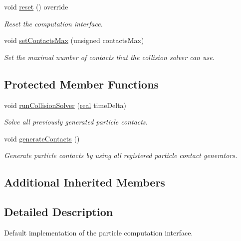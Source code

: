 \begin{DoxyCompactItemize}
void \mbox{\hyperlink{classr3_1_1_default_particle_engine_c_i_a97757c62b4cb1266da29e2b5625bb9d3}{reset}} () override
\begin{DoxyCompactList}\small\item\em Reset the computation interface. \end{DoxyCompactList}\item 
void \mbox{\hyperlink{classr3_1_1_default_particle_engine_c_i_a7dbb49cbf2f5b028656ea2e14174a3ed}{set\+Contacts\+Max}} (unsigned contacts\+Max)
\begin{DoxyCompactList}\small\item\em Set the maximal number of contacts that the collision solver can use. \end{DoxyCompactList}\end{DoxyCompactItemize}
\subsection*{Protected Member Functions}
\begin{DoxyCompactItemize}
\item 
void \mbox{\hyperlink{classr3_1_1_default_particle_engine_c_i_a19138f7707e948b7e8e05647bcba52fe}{run\+Collision\+Solver}} (\mbox{\hyperlink{namespacer3_ab2016b3e3f743fb735afce242f0dc1eb}{real}} time\+Delta)
\begin{DoxyCompactList}\small\item\em Solve all previously generated particle contacts. \end{DoxyCompactList}\item 
void \mbox{\hyperlink{classr3_1_1_default_particle_engine_c_i_a61aea4f32cc73960915d3c68396bd47e}{generate\+Contacts}} ()
\begin{DoxyCompactList}\small\item\em Generate particle contacts by using all registered particle contact generators. \end{DoxyCompactList}\end{DoxyCompactItemize}
\subsection*{Additional Inherited Members}


\subsection{Detailed Description}
Default implementation of the particle computation interface. 

